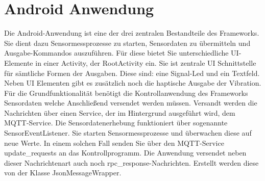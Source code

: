 \documentclass[11pt,a4paper]{report}
\begin{document}
\chapter{Android Anwendung}\label{chap:app}
Die Android-Anwendung ist eine der drei zentralen Bestandteile des Frameworks.
Sie dient dazu Sensormessprozesse zu starten, Sensordaten zu übermitteln und Ausgabe-Kommandos auszuführen.
Für diese bietet Sie unterschiedliche UI-Elemente in einer Activity, der RootActivity ein.
Sie ist zentrale UI Schnittstelle für sämtliche Formen der Ausgaben.
Diese sind: eine Signal-Led und ein Textfeld.
Neben UI Elementen gibt es zusätzlich noch die haptische Ausgabe der Vibration.
\\
Für die Grundfunktionalität benötigt die Kontrollanwendung des Frameworks Sensordaten welche Anschließend versendet werden müssen.
Versandt werden die Nachrichten über einen Service, der im Hintergrund ausgeführt wird, dem MQTT-Service.
Die Sensordatenerhebung funktioniert über sogenannte SensorEventListener.
Sie starten Sensormessprozesse und überwachen diese auf neue Werte.
In einem solchen Fall senden Sie über den MQTT-Service update\_requests an das Kontrollprogramm.
Die Anwendung versendet neben dieser Nachrichtenart auch noch rpc\_response-Nachrichten.
Erstellt werden diese von der Klasse JsonMessageWrapper.
\end{document}
